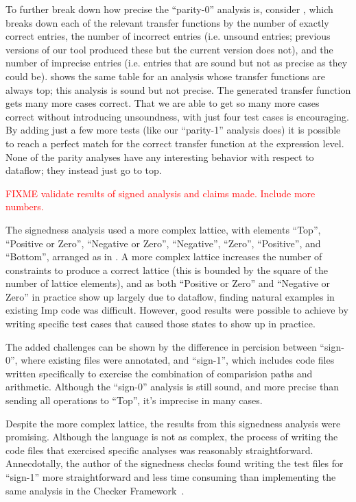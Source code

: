 \documentclass[10pt,conference]{IEEEtran}
\begin{document}
To further break
down how precise the ``parity-0'' analysis is, consider , which breaks
down each of the relevant transfer functions by the number of exactly correct
entries, the number of incorrect entries (i.e. unsound entries; previous
versions of our tool produced these but the current version does not), and the
number of imprecise entries (i.e. entries that are sound but not as precise
as they could be).  shows the same table for an analysis whose
transfer functions are always top; this analysis is sound but not precise.
The generated transfer function gets many more cases correct.
That we are able to get so many more cases correct
without introducing unsoundness, with just four test cases
is encouraging. By adding just a few more tests (like our ``parity-1''
analysis does) it is possible to reach a perfect match for the correct
transfer function at the expression level. None of the parity analyses
have any interesting behavior with respect to dataflow; they instead
just go to top.

\textcolor{red}{FIXME validate results of signed analysis and claims made.
Include more numbers.}

The signedness analysis used a more complex lattice, with elements 
``Top'', ``Positive or Zero'', ``Negative or Zero'', ``Negative'',
``Zero'', ``Positive'', and ``Bottom'', arranged as in .  
A more complex lattice increases the number of constraints to produce a 
correct lattice (this is bounded by the square of the number of lattice elements), and as both ``Positive or Zero''
and ``Negative or Zero'' in practice show up largely due to dataflow, finding
natural examples in existing Imp code was difficult.  However, good results were possible
to achieve by writing specific test cases that caused those states to show up in practice.

The added challenges can be shown by the difference in percision between ``sign-0'', where
existing files were annotated, and ``sign-1'', which includes code files written specifically to exercise
the combination of comparision paths and arithmetic.  Although the ``sign-0'' analysis is still sound, 
and more precise than sending all operations to ``Top'', it's imprecise in many cases.

Despite the more complex lattice, the results from this signedness analysis were promising.  Although 
the language is not as complex, the process of writing the code files that exercised specific analyses 
was reasonably straightforward.  Annecdotally, the author of the signedness checks found writing the 
test files for ``sign-1'' more straightforward and less time consuming than implementing the same analysis
in the Checker Framework~\cite{checker-framework}.
\end{document}
